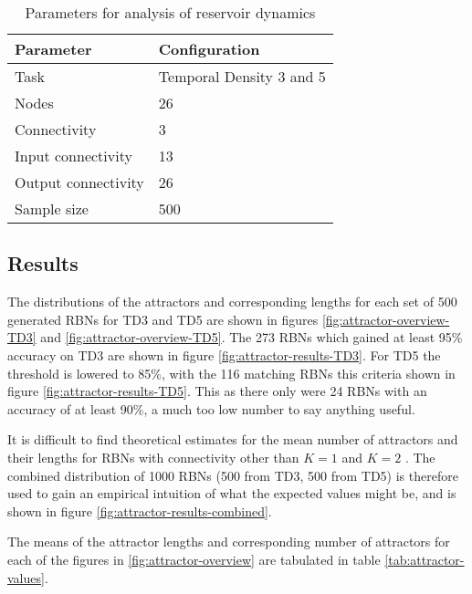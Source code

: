 \begin{table}[h]
    \centering
    \caption{Parameters for analysis of reservoir dynamics}
    \label{tab:reservoir-dynamics-parameters}
    \begin{tabular}{ll}
        \hline
        \textbf{Parameter} & \textbf{Configuration} \\
        \hline
        \hline
        Task                & Temporal Density 3 and 5  \\
        Nodes               & 26                        \\
        Connectivity        & 3                         \\
        Input connectivity  & 13                        \\
        Output connectivity & 26                        \\
        Sample size         & 500 \\
        \hline
    \end{tabular}
\end{table}

\subsection{Results}

The distributions of the attractors and corresponding lengths for each set of 500 generated RBNs for TD3 and TD5 are shown in figures \ref{fig:attractor-overview-TD3} and \ref{fig:attractor-overview-TD5}.
The 273 RBNs which gained at least 95\% accuracy on TD3 are shown in figure \ref{fig:attractor-results-TD3}.
For TD5 the threshold is lowered to 85\%,
with the 116 matching RBNs this criteria shown in figure \ref{fig:attractor-results-TD5}.
This as there only were 24 RBNs with an accuracy of at least 90\%,
a much too low number to say anything useful.

It is difficult to find theoretical estimates for the mean number of attractors and their lengths for RBNs with connectivity other than $ K = 1 $ \cite{drossel2005number} and $ K = 2 $ \cite{samuelsson2003superpolynomial}.
The combined distribution of 1000 RBNs (500 from TD3, 500 from TD5) is therefore used to gain an empirical intuition of what the expected values might be,
and is shown in figure \ref{fig:attractor-results-combined}.

The means of the attractor lengths and corresponding number of attractors for each of the figures in \ref{fig:attractor-overview} are tabulated in table \ref{tab:attractor-values}.

